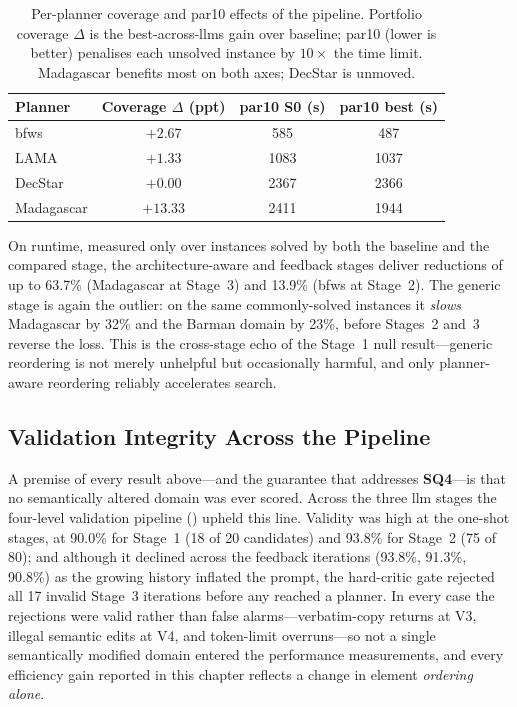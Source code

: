 \begin{table}[htbp]
  \centering
  \caption{Per-planner coverage and \gls{par10} effects of the pipeline. Portfolio coverage $\Delta$ is the best-across-\glspl{llm} gain over baseline; \gls{par10} (lower is better) penalises each unsolved instance by $10\times$ the time limit. Madagascar benefits most on both axes; DecStar is unmoved.}
  \label{tab:cs_coverage_par10}
  \small
  \begin{tabular}{l c c c}
    \toprule
    \textbf{Planner} & \textbf{Coverage $\Delta$ (ppt)} & \textbf{\gls{par10} S0 (s)} & \textbf{\gls{par10} best (s)} \\
    \midrule
    \gls{bfws}  & $+2.67$  & 585  & 487  \\
    LAMA  & $+1.33$  & 1083 & 1037 \\
    DecStar     & $+0.00$  & 2367 & 2366 \\
    Madagascar  & $+13.33$ & 2411 & 1944 \\
    \bottomrule
  \end{tabular}
\end{table}

On runtime, measured only over instances solved by both the baseline and the compared stage, the architecture-aware and feedback stages deliver reductions of up to 63.7\% (Madagascar at Stage~3) and 13.9\% (\gls{bfws} at Stage~2). The generic stage is again the outlier: on the same commonly-solved instances it \emph{slows} Madagascar by 32\% and the Barman domain by 23\%, before Stages~2 and~3 reverse the loss. This is the cross-stage echo of the Stage~1 null result---generic reordering is not merely unhelpful but occasionally harmful, and only planner-aware reordering reliably accelerates search.

\subsection{Validation Integrity Across the Pipeline}
\label{sec:results:cross_stage:validation}

A premise of every result above---and the guarantee that addresses \textbf{SQ4}---is that no semantically altered domain was ever scored. Across the three \gls{llm} stages the four-level validation pipeline () upheld this line. Validity was high at the one-shot stages, at 90.0\% for Stage~1 (18 of 20 candidates) and 93.8\% for Stage~2 (75 of 80); and although it declined across the feedback iterations (93.8\%, 91.3\%, 90.8\%) as the growing history inflated the prompt, the hard-critic gate rejected all 17 invalid Stage~3 iterations before any reached a planner. In every case the rejections were valid rather than false alarms---verbatim-copy returns at V3, illegal semantic edits at V4, and token-limit overruns---so not a single semantically modified domain entered the performance measurements, and every efficiency gain reported in this chapter reflects a change in element \emph{ordering alone}.

